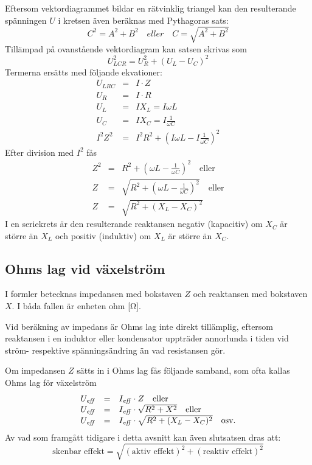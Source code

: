 Eftersom vektordiagrammet bildar en rätvinklig triangel kan den resulterande
spänningen \(U\) i kretsen även beräknas med Pythagoras sats:
%
\[C^2 = A^2 + B^2 \quad eller \quad C = \sqrt{A^2 + B^2}\]
%
Tillämpad på ovanstående vektordiagram kan satsen skrivas som
%
\[U_{LCR}^2 = U_R^2 + ( U_L - U_C)^2\]
%
Termerna ersätts med följande ekvationer:
\[
\begin{array}{rcl}
  U_{LRC} &=& I \cdot Z \\[1ex]
  U_R     &=& I \cdot R \\[1ex]
  U_L     &=& I X_L = I \omega L \\[1ex]
  U_C     &=& I X_C = I \frac{1}{\omega C} \\[1ex]
  I^2 Z^2 &=& I^2 R^2 + ( I \omega L - I\frac{1}{\omega C})^2
\end{array}
\]
%
Efter division med \(I^2\) fås
%
\[
\begin{array}{rcl}
  Z^2 &=& R^2 + ( \omega L - \frac{1}{\omega C} )^2 \quad \text{eller} \\[1ex]
  Z   &=& \sqrt{R^2 + (\omega L - \frac{1}{\omega C})^2} \quad \text{eller} \\[1ex]
  Z   &=& \sqrt{R^2 + (X_L - X_C)^2}
\end{array}
\]
I en seriekrets är den resulterande reaktansen negativ (kapacitiv) om \(X_C\) är
större än \(X_L\) och positiv (induktiv) om \(X_L\) är större än \(X_C\).

\subsection{Ohms lag vid växelström}
\label{ohms_lag_växelström}

I formler betecknas impedansen med bokstaven \(Z\) och reaktansen med bokstaven
\(X\).
I båda fallen är enheten ohm [\unit{\ohm}].

Vid beräkning av impedans är Ohms lag inte direkt tillämplig, eftersom
reaktansen i en induktor eller kondensator uppträder annorlunda i tiden vid
ström- respektive spänningsändring än vad resistansen gör.

Om impedansen \(Z\) sätts in i Ohms lag fås följande samband, som ofta kallas
Ohms lag för växelström
\[
\begin{array}{rcl}
  U_{\it eff} &=& I_{\it eff} \cdot Z \quad \text{eller} \\
  U_{\it eff} &=& I_{\it eff} \cdot \sqrt{R^2 + X^2} \quad \text{eller} \\
  U_{\it eff} &=& I_{\it eff} \cdot \sqrt{R^2 + (X_L - X_C)^2} \quad \text{osv.}
\end{array}
\]
Av vad som framgått tidigare i detta avsnitt kan även slutsatsen dras att:
%
\[
\text{skenbar effekt} = \sqrt{(\text{aktiv effekt})^2 + (\text{reaktiv effekt})^2}
\]
%
